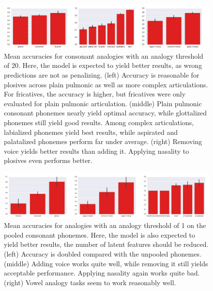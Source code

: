 \documentclass[11pt]{article}
\begin{document}
\begin{figure}[h!] %
   \centering
   \includegraphics[width=\textwidth]{detailed_evaluation_topn20} 
   \caption{Mean accuracies for consonant analogies with an analogy threshold of 20. Here, the model is expected to yield better results, as wrong predictions are not as penalizing. (left) Accuracy is reasonable for plosives across plain pulmonic as well as more complex articulations. For fricatives, the accuracy is higher, but fricatives were only evaluated for plain pulmonic articulation. (middle) Plain pulmonic consonant phonemes nearly yield optimal accuracy, while glottalized phonemes still yield good results. Among complex articulations,  labialized phonemes yield best results, while aspirated and palatalized phonemes perform far under average. (right) Removing voice yields better results than adding it.  Applying nasality to plosives even performs better.}
   \label{fig:detailed_evaluation_consonants}
\end{figure}

\begin{figure}[h!] %
   \centering
   \includegraphics[width=\textwidth]{detailed_evaluation_topn1_poooled} 
   \caption{Mean accuracies for analogies with an analogy threshold of 1 on the pooled consonant phonemes. Here, the model is also expected to yield better results, the number of latent features should be reduced. (left) Accuracy is doubled compared with the unpooled phonemes. (middle) Adding voice works quite well, while removing it still yields acceptable performance. Applying nasality again works quite bad. (right) Vowel analogy tasks seem to work reasonably well.}
   \label{fig:detailed_evaluation_topn1_poooled}
\end{figure}
\end{document}
